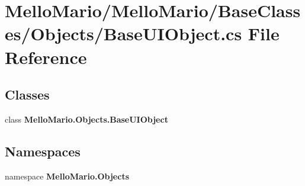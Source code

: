 \section{Mello\+Mario/\+Mello\+Mario/\+Base\+Classes/\+Objects/\+Base\+U\+I\+Object.cs File Reference}
\label{BaseUIObject_8cs}
\subsection*{Classes}
\begin{DoxyCompactItemize}
\item 
class \textbf{ Mello\+Mario.\+Objects.\+Base\+U\+I\+Object}
\end{DoxyCompactItemize}
\subsection*{Namespaces}
\begin{DoxyCompactItemize}
\item 
namespace \textbf{ Mello\+Mario.\+Objects}
\end{DoxyCompactItemize}
